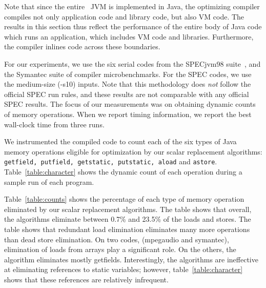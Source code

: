 Note that since the entire \jp\ JVM is implemented in Java, the optimizing
compiler compiles not only application code and library code, but also
VM code.  The results in this section thus reflect the performance
of the entire body of Java code which runs an application, which includes
VM code and libraries. Furthermore, the compiler inlines code across
these boundaries.

For our experiments, we use the six serial codes from the 
SPECjvm98 suite~\cite{specJVM98}, and the Symantec suite of 
compiler microbenchmarks.  For the SPEC codes, we use the
medium-size (-s10) inputs.  Note that this methodology does {\em not}
follow the official SPEC run rules, and these results are not
comparable with any official SPEC results.  
The focus of our measurements was on obtaining dynamic counts
of memory operations.
When we report timing
information, we report the best wall-clock time from three runs.



We instrumented the compiled code to count each of the six types of Java memory
operations eligible for optimization by our scalar replacement
algorithms: {\tt getfield, putfield, getstatic, putstatic, aload} and 
{\tt astore}.  Table~\ref{table:character} shows the dynamic count of
each operation during a sample run of each program.



Table~\ref{table:counts} shows the percentage of each type of memory
operation eliminated by our scalar replacement algorithms.  
The table shows that
overall, the algorithms eliminate between 0.7\% and 23.5\% of the
loads and stores.  The table shows that redundant load elimination
eliminates many more operations than dead store elimination.  On two
codes, (mpegaudio and symantec), elimination of loads from arrays play
a significant role.  On the others, the algorithm eliminates mostly
getfields.  Interestingly, the algorithms are ineffective at eliminating
references to static variables; however, table~\ref{table:character} shows
that these references are relatively infrequent.


